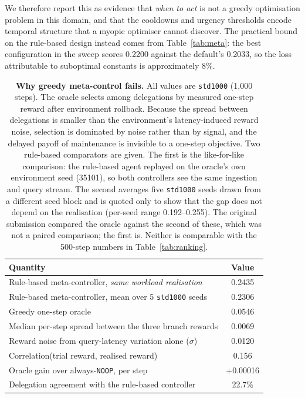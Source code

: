 \documentclass[fleqn,10pt]{wlscirep}
\newcommand{\noop}{\texttt{NOOP}}
\begin{document}
We therefore report this as evidence that \emph{when to act} is not a
greedy optimisation problem in this domain, and that the cooldowns and
urgency thresholds encode temporal structure that a myopic optimiser
cannot discover. The practical bound on the rule-based design instead
comes from Table~\ref{tab:meta}: the best configuration in the sweep
scores 0.2200 against the default's 0.2033, so the loss attributable to
suboptimal constants is approximately 8\%.

\begin{table}[!htbp]
\centering
\begin{tabular}{lc}
\toprule
\textbf{Quantity} & \textbf{Value} \\
\midrule
Rule-based meta-controller, \emph{same workload realisation}      & 0.2435 \\
Rule-based meta-controller, mean over 5 \texttt{std1000} seeds   & 0.2306 \\
Greedy one-step oracle                                           & 0.0546 \\
\midrule
Median per-step spread between the three branch rewards & 0.0069 \\
Reward noise from query-latency variation alone ($\sigma$) & 0.0120 \\
Correlation(trial reward, realised reward)       & 0.156 \\
Oracle gain over always-\noop{}, per step        & $+$0.00016 \\
Delegation agreement with the rule-based controller & 22.7\% \\
\bottomrule
\end{tabular}
\caption{\label{tab:oracle}\textbf{Why greedy meta-control fails.}
  All values are \texttt{std1000} (1{,}000 steps). The oracle selects
  among delegations by measured one-step reward after environment
  rollback. Because the spread between delegations is smaller than the
  environment's latency-induced reward noise, selection is dominated by
  noise rather than by signal, and the delayed payoff of maintenance is
  invisible to a one-step objective. Two rule-based comparators are
  given. The first is the like-for-like comparison: the rule-based agent
  replayed on the oracle's own environment seed (35101), so both
  controllers see the same ingestion and query stream. The second
  averages five \texttt{std1000} seeds drawn from a different seed block
  and is quoted only to show that the gap does not depend on the
  realisation (per-seed range 0.192--0.255). The original submission
  compared the oracle against the second of these, which was not a
  paired comparison; the first is. Neither is comparable with the 500-step numbers in
  Table~\ref{tab:ranking}.}
\end{table}
\end{document}

